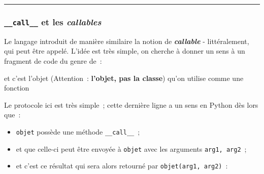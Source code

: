     \begin{center}\rule{0.5\linewidth}{\linethickness}\end{center}

    \hypertarget{call__-et-les-callables}{%
\subsubsection{\texorpdfstring{\texttt{\_\_call\_\_} et les
\emph{callables}}{\_\_call\_\_ et les callables}}\label{call__-et-les-callables}}

    Le langage introduit de manière similaire la notion de
\textbf{\emph{callable}} - littéralement, qui peut être appelé. L'idée
est très simple, on cherche à donner un sens à un fragment de code du
genre de~:

    \begin{Shaded}
\begin{Highlighting}[frame=lines,framerule=0.6mm,rulecolor=\color{asisframecolor}]
\OperatorTok{=}
\end{Highlighting}
\end{Shaded}

et c'est l'objet (Attention~: \textbf{l'objet, pas la classe}) qu'on
utilise comme une fonction

\begin{Shaded}
\begin{Highlighting}[frame=lines,framerule=0.6mm,rulecolor=\color{asisframecolor}]
\end{Highlighting}
\end{Shaded}

    Le protocole ici est très simple~; cette dernière ligne a un sens en
Python dès lors que~:

\begin{itemize}
\tightlist
\item
  \texttt{objet} possède une méthode \texttt{\_\_call\_\_}~;
\item
  et que celle-ci peut être envoyée à \texttt{objet} avec les arguments
  \texttt{arg1,\ arg2}~;
\item
  et c'est ce résultat qui sera alors retourné par
  \texttt{objet(arg1,\ arg2)}~:
\end{itemize}

    \begin{Shaded}
\begin{Highlighting}[frame=lines,framerule=0.6mm,rulecolor=\color{asisframecolor}]
\end{Highlighting}
\end{Shaded}

